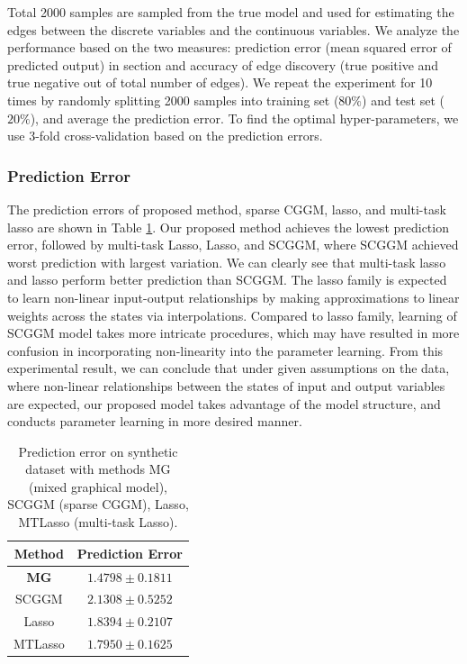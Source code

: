 \documentclass{article}
\begin{document}
 Total 2000 samples are sampled from the true model and used for estimating the edges between the discrete variables and the continuous variables. 
 We analyze the performance based on the two measures: prediction error (mean squared error of predicted output) in section and accuracy of edge discovery (true positive and true negative out of total number of edges). 
We repeat the experiment for 10 times by randomly splitting 2000 samples into training set ($80 \%$) and test set ($20\%$), and average the prediction error.
 To find the optimal hyper-parameters, we use 3-fold cross-validation based on the prediction errors.
 
 
 
 
 

\subsubsection{Prediction Error}

The prediction errors of proposed method, sparse CGGM, lasso, and multi-task lasso are shown in Table \ref{table:syn_pred_err}.
Our proposed method achieves the lowest prediction error, followed by multi-task Lasso, Lasso, and SCGGM, where SCGGM achieved worst prediction with largest variation.
We can clearly see that multi-task lasso and lasso perform better prediction than SCGGM.
The lasso family is expected to learn non-linear input-output relationships by making approximations to linear weights across the states via interpolations.
Compared to lasso family, learning of SCGGM model takes more intricate procedures, which may have resulted in more confusion in incorporating non-linearity into the parameter learning.
From this experimental result, we can conclude that under given assumptions on the data, where non-linear relationships between the states of input and output variables are expected, our proposed model takes advantage of the model structure, and conducts parameter learning in more desired manner.



 
\begin{table}[hbtp]
\begin{center}
    \begin{tabular}{| c | c |}
    \hline
    Method & Prediction Error \\
    \hline
    \textbf{MG} & $\mathbf{1.4798 \pm 0.1811}$ \\
    SCGGM & $2.1308 \pm 0.5252$  \\
    Lasso & $1.8394 \pm 0.2107$  \\
    MTLasso & $1.7950 \pm 0.1625$ \\
    \hline 
    \end{tabular}
\end{center}
 	\caption{Prediction error on synthetic dataset with methods MG (mixed graphical model), SCGGM (sparse CGGM), Lasso, MTLasso (multi-task Lasso).}
 \label{table:syn_pred_err}
\end{table}
\end{document}
